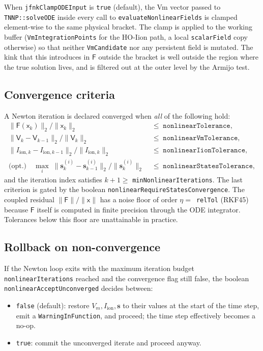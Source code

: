 \documentclass[11pt,a4paper]{article}
\newcommand{\Vm}{V_{m}}
\newcommand{\Iion}{I_{\text{ion}}}
\newcommand{\Iionsub}[1]{I_{\text{ion},#1}}
\newcommand{\code}[1]{\texttt{\small #1}}
\begin{document}
When \code{jfnkClampODEInput} is \code{true} (default), the Vm vector
passed to \code{TNNP::solveODE} inside every call to
\code{evaluateNonlinearFields} is clamped element-wise to the same
physical bracket. The clamp is applied to the working buffer
(\code{VmIntegrationPoints} for the HO-Iion path, a local
\code{scalarField} copy otherwise) so that neither \code{VmCandidate}
nor any persistent field is mutated. The kink that this introduces in
$\mathsf{F}$ outside the bracket is well outside the region where the
true solution lives, and is filtered out at the outer level by the
Armijo test.

\subsection{Convergence criteria}

A Newton iteration is declared converged when \emph{all} of the
following hold:
\begin{align}
  \lVert \mathsf{F}(\mathsf{x}_{k}) \rVert_{2} / \lVert \mathsf{x}_{k} \rVert_{2}
     &\;\le\; \texttt{nonlinearTolerance}, \\
  \lVert \mathsf{V}_{k} - \mathsf{V}_{k-1} \rVert_{2} /
     \lVert \mathsf{V}_{k} \rVert_{2}
     &\;\le\; \texttt{nonlinearVmTolerance}, \\
  \lVert \Iionsub{k} - \Iionsub{k-1} \rVert_{2} /
     \lVert \Iionsub{k} \rVert_{2}
     &\;\le\; \texttt{nonlinearIionTolerance}, \\
  \text{(opt.)}\quad
  \max_{i}\;
  \lVert \mathbf{s}_{k}^{(i)} - \mathbf{s}_{k-1}^{(i)} \rVert_{2} /
     \lVert \mathbf{s}_{k}^{(i)} \rVert_{2}
     &\;\le\; \texttt{nonlinearStatesTolerance},
\end{align}
and the iteration index satisfies $k + 1 \ge $
\code{minNonlinearIterations}. The last criterion is gated by the
boolean \code{nonlinearRequireStatesConvergence}. The coupled residual
$\lVert \mathsf{F} \rVert / \lVert \mathsf{x} \rVert$ has a noise floor
of order $\eta = $~\code{relTol} (RKF45) because $\mathsf{F}$ itself is
computed in finite precision through the ODE integrator. Tolerances
below this floor are unattainable in practice.

\subsection{Rollback on non-convergence}

If the Newton loop exits with the maximum iteration budget
\code{nonlinearIterations} reached and the convergence flag still
false, the boolean \code{nonlinearAcceptUnconverged} decides between:
\begin{itemize}[topsep=0pt]
  \item \code{false} (default): restore $\Vm, \Iion, \mathbf{s}$ to
        their values at the start of the time step, emit a
        \code{WarningInFunction}, and proceed; the time step
        effectively becomes a no-op.
  \item \code{true}: commit the unconverged iterate and proceed
        anyway.
\end{itemize}
\end{document}
